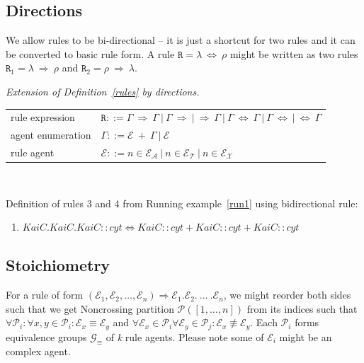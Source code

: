 \documentclass{elsarticle}
\newcommand{\choice}{|}
\begin{document}
\subsection{Directions}

We allow rules to be bi-directional -- it is just a shortcut for two rules and it can be converted to basic rule form. A rule $\mathtt{R} = \lambda ~\Leftrightarrow~ \rho$ might be written as two rules $\mathtt{R}_1 = \lambda ~\Rightarrow~ \rho$ and $\mathtt{R}_2 = \rho ~\Rightarrow~ \lambda$.

\begin{definition}\label{rules:directions}
\emph{Extension of Definition~\ref{rules} by directions.}

\begin{center}
{\small
\hspace*{-1cm}\begin{tabular}{ l l }
 rule expression & $\mathtt{R} ::= \Gamma ~\Rightarrow~ \Gamma ~|~ \Gamma ~\Rightarrow ~|~ \Rightarrow~ \Gamma ~|~ \Gamma ~\Leftrightarrow~ \Gamma ~|~ \Gamma ~\Leftrightarrow ~|~ \Leftrightarrow~ \Gamma $\\
 agent enumeration & $\Gamma ::= \mathcal{E}~ +~\Gamma ~|~ \mathcal{E}$\\
 rule agent & $\mathcal{E} ::= n \in \mathcal{E}_\mathcal{A}~\choice~n \in \mathcal{E}_\mathcal{T}~\choice~n \in \mathcal{E}_\mathcal{X}$\\
\end{tabular}
}
\end{center}
\end{definition}

\begin{running_example}\label{run2}
$ $

\noindent Definition of rules 3 and 4 from Running example~\ref{run1} using bidirectional rule:
\begin{enumerate}
\item $KaiC.KaiC.KaiC::cyt \Leftrightarrow KaiC::cyt + KaiC::cyt + KaiC::cyt$
\end{enumerate}
\end{running_example}

\subsection{Stoichiometry}

For a rule of form $(\mathcal{E}_1, \mathcal{E}_2, \ldots, \mathcal{E}_n) \Rightarrow \mathcal{E}_1.\mathcal{E}_2.~\ldots~.\mathcal{E}_n$, we might reorder both sides such that we get Noncrossing partition $\mathcal{P}([1,\ldots,n])$ from its indices such that $\forall \mathcal{P}_i: \forall x,y \in \mathcal{P}_i: \mathcal{E}_x \equiv \mathcal{E}_y$ and $\forall \mathcal{E}_x \in \mathcal{P}_i \forall \mathcal{E}_y \in \mathcal{P}_j: \mathcal{E}_x \not\equiv \mathcal{E}_y$. Each $\mathcal{P}_i$ forms equivalence groups $\mathcal{G}_\equiv$ of \textit{k} rule agents. Please note some of $\mathcal{E}_i$ might be an complex agent.
\end{document}
